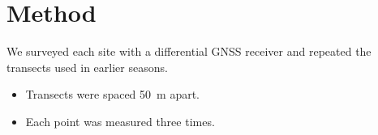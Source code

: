 \section{Method}
We surveyed each site with a differential GNSS receiver and repeated
the transects used in earlier seasons.
\begin{itemize}
  \item Transects were spaced 50~m apart.
  \item Each point was measured three times.
\end{itemize}
